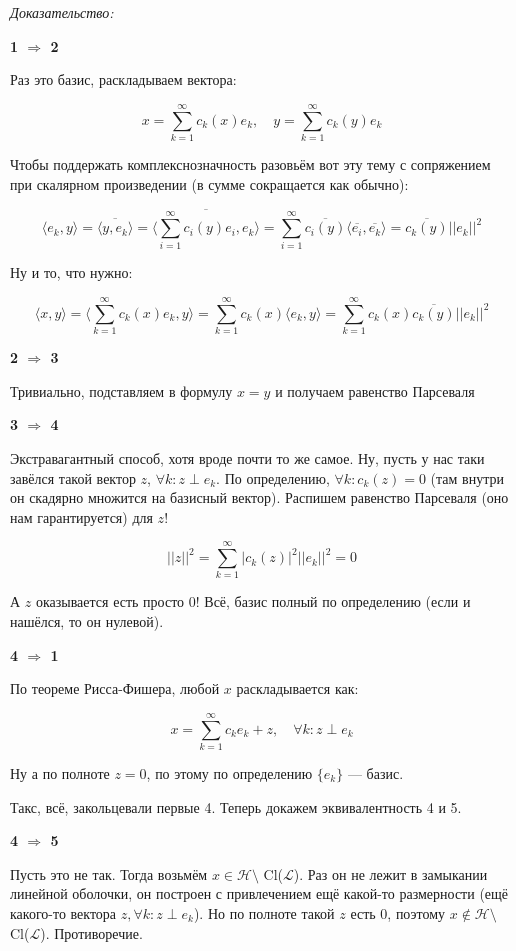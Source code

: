 \documentclass{article}
\def\sk#1#2{\langle #1, #2 \rangle}
\begin{document}
\textit{Доказательство:}

\textbf{1 $\Rightarrow$ 2}

Раз это базис, раскладываем вектора:

\[x = \sum_{k = 1}^{\infty} c_k(x)e_k, \quad y = \sum_{k = 1}^{\infty} c_k(y)e_k\]

Чтобы поддержать комплекснозначность разовьём вот эту тему с сопряжением при скалярном произведении (в сумме сокращается как обычно):

\[\sk{e_k}{y} = \overline{\sk{y}{e_k}} = \overline{\sk{\sum_{i = 1}^{\infty} c_i(y)e_i}{e_k}} = \sum_{i = 1}^{\infty}\overline{c_i(y)}\sk{\overline{e_i}}{\overline{e_k}} = \overline{c_k(y)}||e_k||^2\]

Ну и то, что нужно:

\[\sk{x}{y} = \sk{\sum_{k = 1}^{\infty} c_k(x)e_k}{y} = \sum_{k = 1}^{\infty} c_k(x)\sk{e_k}{y} = \sum_{k = 1}^{\infty} c_k(x) \overline{c_k(y)}||e_k||^2\]

\textbf{2 $\Rightarrow$ 3}

Тривиально, подставляем в формулу $x = y$ и получаем равенство Парсеваля

\textbf{3 $\Rightarrow$ 4}

Экстравагантный способ, хотя вроде почти то же самое. Ну, пусть у нас таки завёлся такой вектор $z$, $\forall k : z \perp e_k$. По определению, $\forall k: c_k(z) = 0$ (там внутри он скадярно множится на базисный вектор). Распишем равенство Парсеваля (оно нам гарантируется) для $z$!

\[||z||^2 = \sum_{k = 1}^{\infty} |c_k(z)|^2 ||e_k||^2 = 0\]

А $z$ оказывается есть просто 0! Всё, базис полный по определению (если и нашёлся, то он нулевой).

\textbf{4 $\Rightarrow$ 1}

По теореме Рисса-Фишера, любой $x$ раскладывается как:

\[x = \sum_{k = 1}^{\infty} c_k e_k + z, \quad \forall k: z \perp e_k\]

Ну а по полноте $z = 0$, по этому по определению $\{e_k\}$ --- базис.


Такс, всё, закольцевали первые 4. Теперь докажем эквивалентность 4 и 5.

\textbf{4 $\Rightarrow$ 5}

Пусть это не так. Тогда возьмём $x \in \mathcal{H} \setminus $ Cl($\mathcal{L}$). Раз он не лежит в замыкании линейной оболочки, он построен с привлечением ещё какой-то размерности (ещё какого-то вектора $z, \forall k : z \perp e_k$). Но по полноте такой $z$ есть 0, поэтому $x \notin \mathcal{H} \setminus $ Cl($\mathcal{L}$). Противоречие.
\end{document}
